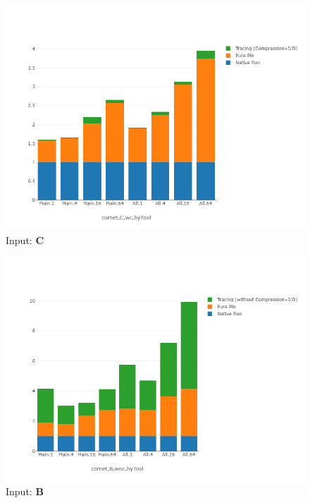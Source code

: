 \begin{figure}[!t]
\centering
\includegraphics[width=6in]{figs.comet/comet_chartDet_C_wc_byTool_p3_5.png}
\caption{ Input: \textbf{C}
}
\label{comet_chartDet_C_wc_byTool_p3_5}
\end{figure}





\begin{figure}[!t]
\centering
\includegraphics[width=6in]{figs.comet/comet_chartDet_B_woc_byTool_p3_5.png}
\caption{ Input: \textbf{B}
}
\label{comet_chartDet_B_woc_byTool_p3_5}
\end{figure}

